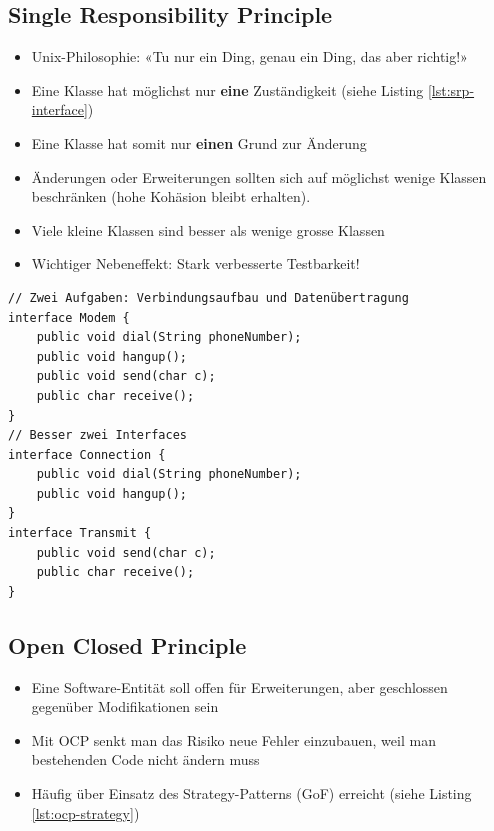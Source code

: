 \newpage

\subsection{Single Responsibility Principle}

\begin{itemize}
	\item Unix-Philosophie: «Tu nur ein Ding, genau ein Ding, das aber richtig!»
	\item Eine Klasse hat möglichst nur \textbf{eine} Zuständigkeit (siehe Listing \ref{lst:srp-interface})
	\item Eine Klasse hat somit nur \textbf{einen} Grund zur Änderung
	\item Änderungen oder Erweiterungen sollten sich auf möglichst wenige Klassen beschränken (hohe Kohäsion bleibt erhalten).
	\item Viele kleine Klassen sind besser als wenige grosse Klassen
	\item Wichtiger Nebeneffekt: Stark verbesserte Testbarkeit!
\end{itemize}

\begin{lstlisting}[caption={Schlechtes Interface nach SRP},label=lst:srp-interface]
// Zwei Aufgaben: Verbindungsaufbau und Datenübertragung
interface Modem {
	public void dial(String phoneNumber);
	public void hangup();
	public void send(char c);
	public char receive();
}
// Besser zwei Interfaces
interface Connection {
	public void dial(String phoneNumber);
	public void hangup();
}
interface Transmit {
	public void send(char c);
	public char receive();
}
\end{lstlisting}

\subsection{Open Closed Principle}

\begin{itemize}
	\item Eine Software-Entität soll offen für Erweiterungen, aber geschlossen gegenüber Modifikationen sein
	\item Mit OCP senkt man das Risiko neue Fehler einzubauen, weil man bestehenden Code nicht ändern muss
	\item Häufig über Einsatz des Strategy-Patterns (GoF) erreicht (siehe Listing \ref{lst:ocp-strategy})
\end{itemize}


